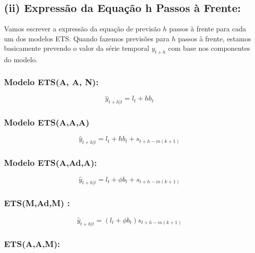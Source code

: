 \documentclass[a4paper, 12pt]{article}
\begin{document}
    

\subsection{(ii) Expressão da Equação h Passos à Frente:}

Vamos escrever a expressão da equação de previsão $h$
 passos à frente para cada um dos modelos ETS. Quando fazemos previsões para $h$ passos à frente, estamos basicamente prevendo o valor da série temporal $y_{t+h}$ com base nos componentes do modelo.

\subsubsection{Modelo ETS(A, A, N):}

\begin{equation*}
    \hat y_{t+h|t} = l_t + hb_t
\end{equation*}

\subsubsection{Modelo ETS(A,A,A)}
\begin{equation*}
    \hat y_{t+h|t} = l_t + hb_t + s_{t+h-m(k+1)}
\end{equation*}


\subsubsection{Modelo ETS(A,Ad,A):}

    \begin{equation*}
        \hat y_{t+h|t} = l_t + \phi b_t + s_{t+h-m(k+1)}
    \end{equation*}

\subsubsection{ETS(M,Ad,M) :}

    \begin{equation*}
        \hat y_{t+h|t} = (l_t + \phi b_t)s_{t+h-m(k+1)}
    \end{equation*}

    

\subsubsection{ETS(A,A,M):}
\end{document}
